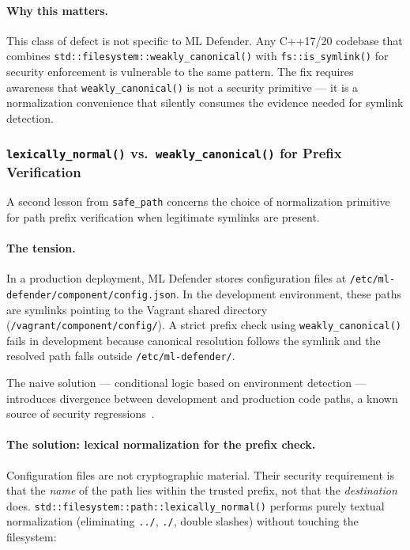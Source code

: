 \documentclass[11pt,a4paper]{article}
\begin{document}
    \paragraph{Why this matters.}
    This class of defect is not specific to ML Defender. Any C++17/20 codebase that combines
    \texttt{std::filesystem::weakly\_canonical()} with \texttt{fs::is\_symlink()} for security
    enforcement is vulnerable to the same pattern. The fix requires awareness that
    \texttt{weakly\_canonical()} is not a security primitive --- it is a normalization
    convenience that silently consumes the evidence needed for symlink detection.

    \subsubsection{\texttt{lexically\_normal()} vs.\ \texttt{weakly\_canonical()} for Prefix Verification}
    \label{subsubsec:lexical-vs-canonical}

    A second lesson from \texttt{safe\_path} concerns the choice of normalization primitive
    for path prefix verification when legitimate symlinks are present.

    \paragraph{The tension.}
    In a production deployment, ML Defender stores configuration files at
    \texttt{/etc/ml-defender/component/config.json}. In the development environment,
    these paths are symlinks pointing to the Vagrant shared directory
    (\texttt{/vagrant/component/config/}). A strict prefix check using
    \texttt{weakly\_canonical()} fails in development because canonical resolution
    follows the symlink and the resolved path falls outside
    \texttt{/etc/ml-defender/}.

    The naive solution --- conditional logic based on environment detection --- introduces
    divergence between development and production code paths, a known source of
    security regressions~\cite{cwe22}.

    \paragraph{The solution: lexical normalization for the prefix check.}
    Configuration files are not cryptographic material. Their security requirement is
    that the \emph{name} of the path lies within the trusted prefix, not that the
    \emph{destination} does. \texttt{std::filesystem::path::lexically\_normal()} performs
    purely textual normalization (eliminating \texttt{../}, \texttt{./}, double slashes)
    without touching the filesystem:
\end{document}
